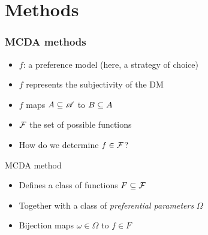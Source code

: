 \documentclass[french,english]{beamer}
\begin{document}
\section{Methods}
\begin{frame}
	\frametitle{MCDA methods}
	\begin{itemize}
		\item $f$: a preference model (here, a strategy of choice)
		\item $f$ represents the subjectivity of the \ac{DM}
		\item $f$ maps $A \subseteq \mathscr{A}$ to $B \subseteq A$
		\item $\mathcal{F}$ the set of possible functions
		\item How do we determine $f \in \mathcal{F}$?
	\end{itemize}
	\begin{block}{MCDA method}
		\begin{itemize}
			\item Defines a class of functions $F \subseteq \mathcal{F}$
			\item Together with a class of \emph{preferential parameters} $\Omega$
			\item Bijection maps $\omega \in \Omega$ to $f \in F$
		\end{itemize}
	\end{block}
\end{frame}
\end{document}
